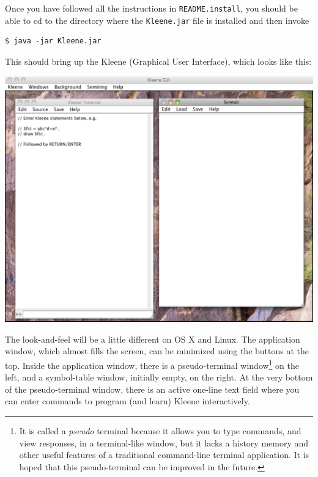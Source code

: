 Once you have followed all the instructions in \texttt{README.install},
you should be able to cd to the directory where the \texttt{Kleene.jar}
file is installed and then invoke 

\begin{Verbatim}
$ java -jar Kleene.jar
\end{Verbatim}

This should bring up the Kleene  (Graphical User Interface),
which looks like this:


\begin{center}
\includegraphics[width=135mm]{images/KleeneGUI.pdf}
\end{center}


The look-and-feel will be a little different on OS X and Linux.  The
application window, which almost fills the screen, can be minimized using
the buttons at the top.  Inside the application window, there is a
pseudo-terminal window\footnote{It is called a \emph{pseudo} terminal
because it allows you to type commands, and view responses, in a
terminal-like window, but it lacks a history memory and other useful
features of a traditional command-line terminal application.  It is hoped
that this pseudo-terminal can be improved in the future.}  on the left,
and a symbol-table window, initially empty, on the right.  At the very
bottom of the pseudo-terminal window, there is an active one-line text
field where you can enter commands to program (and learn) Kleene
interactively.  

